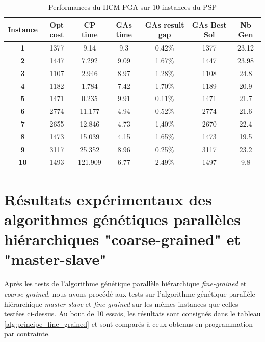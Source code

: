 \documentclass[12pt,a4paper]{article}
\begin{document}
	\begin{table}[h]
		\centering
		\begin{tabular}{|c|c|c|c|c|c|c|}
			\hline
			\textbf{Instance} & \textbf{Opt cost} & \textbf{CP time} & \textbf{GAs time} & \textbf{GAs result gap} & \textbf{GAs Best Sol} & \textbf{Nb Gen}\\
			\hline
			\textbf{1} & 1377 & 9.14 & 9.3 & 0.42\% & 1377 & 23.12 \\
			\textbf{2} & 1447 & 7.292 & 9.09 & 1.67\% & 1447 & 23.98\\
			\textbf{3} & 1107 & 2.946 & 8.97 & 1.28\% & 1108 & 24.8\\
			\textbf{4} & 1182 & 1.784 & 7.42 & 1.70\% & 1189 & 20.9\\
			\textbf{5} & 1471 & 0.235 & 9.91 & 0.11\% & 1471 & 21.7\\
			\textbf{6} & 2774 & 11.177 & 4.94 & 0.52\% & 2774 & 21.6\\
			\textbf{7} & 2655 & 12.846 & 4.73 & 1,40\% & 2670 & 22.4\\
			\textbf{8} & 1473 & 15.039 & 4.15 & 1.65\% & 1473 & 19.5\\
			\textbf{9} & 3117 & 25.352 & 8.96 & 0.25\% & 3117 & 23.2\\
			\textbf{10} & 1493 & 121.909 & 6.77 & 2.49\% & 1497 & 9.8\\
			\hline
		\end{tabular}	
		\caption{Performances du HCM-PGA sur 10 instances du PSP}	
	\end{table}			
		
		\section{Résultats expérimentaux des algorithmes génétiques parallèles hiérarchiques "coarse-grained" et "master-slave"}
		
		Après les tests de l'algorithme génétique parallèle hiérarchique \emph{fine-grained} et \emph{coarse-grained}, nous avons procédé aux tests sur l'algorithme génétique parallèle hiérarchique \emph{master-slave} et \emph{fine-grained} sur les mêmes instances que celles testées ci-dessus. Au bout de 10 essais, les résultats sont consignés dans le tableau \ref{alg:principe_fine_grained} et sont comparés à ceux obtenus en programmation par contrainte.
		
\end{document}
